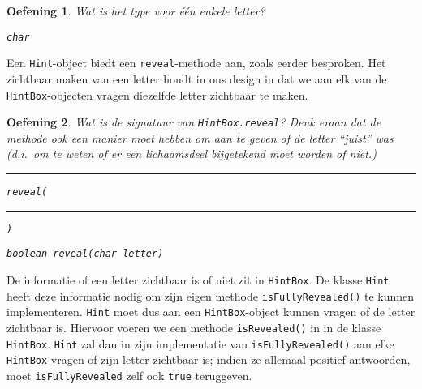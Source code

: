 \documentclass[a4paper,dutch]{article}
\newtheorem{exercise}{Oefening}[section]
\begin{document}
\begin{exercise}
Wat is het type voor \'e\'en enkele letter?
\begin{solution}
\tt char
\end{solution}
\end{exercise}

Een {\tt Hint}-object biedt een {\tt reveal}-methode aan, zoals eerder besproken.
Het zichtbaar maken van een letter houdt in ons design in dat we aan
elk van de {\tt HintBox}-objecten vragen diezelfde letter zichtbaar te maken.

\begin{center}
\end{center}

\begin{exercise}
Wat is de signatuur van {\tt HintBox.reveal}? Denk eraan dat de methode ook
een manier moet hebben om aan te geven of de letter ``juist'' was (d.i.\ om te weten
of er een lichaamsdeel bijgetekend moet worden of niet.)
\begin{center}
  \rule{2cm}{.5pt} {\tt reveal(}\rule{4cm}{.5pt}{\tt)}
\end{center}
\begin{solution}
\tt boolean reveal(char letter)
\end{solution}
\end{exercise}

De informatie of een letter zichtbaar is of niet zit in {\tt HintBox}. De klasse {\tt Hint}
heeft deze informatie nodig om zijn eigen methode {\tt isFullyRevealed()} te kunnen implementeren.
{\tt Hint} moet dus aan een {\tt HintBox}-object kunnen vragen of de letter zichtbaar is.
Hiervoor voeren we een methode {\tt isRevealed()} in in de klasse {\tt HintBox}.
{\tt Hint} zal dan in zijn implementatie van {\tt isFullyRevealed()} aan elke {\tt HintBox} vragen
of zijn letter zichtbaar is; indien ze allemaal positief antwoorden, moet {\tt isFullyRevealed} zelf ook
{\tt true} teruggeven.

\begin{center}
\end{center}
\end{document}
